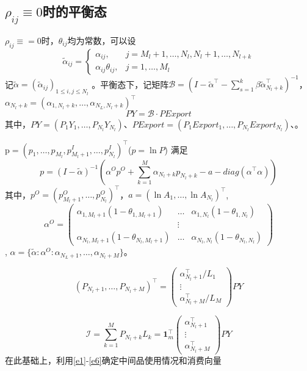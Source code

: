 \documentclass{article}
\begin{document}
\subsection{$\rho_{ij}\equiv0$时的平衡态}
$\rho_{ij}\equiv=0$时，$\theta_{ij}$均为常数，可以设
\begin{equation}
    \tilde{\alpha}_{ij}=\begin{cases}
        \alpha_{ij}, & j=M_l+1,\dots,N_l,N_l+1,\dots,N_{l+k}\\
        \alpha_{ij}\theta_{ij}, &j=1,\dots,M_l
    \end{cases}
\end{equation} 记$\tilde{\alpha}=(\tilde{\alpha}_{ij})_{1\leq i,j\leq N_l}$
。平衡态下，记矩阵$\mathcal{B}=(I-\tilde{\alpha}^\top-\sum_{s=1}^k\beta\tilde\alpha_{N_l+k}^\top)^{-1}$，$\alpha_{N_l+k}=(\alpha_{1,N_l+k},\dots, \alpha_{N_L,N_l+k})^\top$
\begin{equation}
PY=\mathcal{B}\cdot PExport
\end{equation} 其中，$PY=(P_1Y_1,\dots,P_{N_l}Y_{N_l})$、$PExport=(P_1Export_1,\dots,P_{N_l}Export_{N_l})$、。

$\mathrm{p}=(p_1,\dots,p_{M_l},p^I_{M_l+1},\dots,p^I_{N_l})^\top$($p=\ln P$) 满足
\begin{equation}
    p=(I-\tilde{\alpha})^{-1}\left(\alpha^O p^O +\sum_{k=1}^{M}\alpha_{N_l+k}p_{N_l+k}-a-diag(\alpha^\top\alpha)\right)
\end{equation} 其中，$p^O=(p^O_{M_l+1},\dots,p_{N_l}^O)^\top$，$a=(\ln A_1,\dots,\ln A_{N_l})^\top$, $$\alpha^O=\left(\begin{array}{ccc}
    \alpha_{1,M_l+1}(1-\theta_{1,M_l+1}) &\dots& \alpha_{1,N_l}(1-\theta_{1,N_l}) \\
    &\vdots &\\
     \alpha_{N_l,M_l+1}(1-\theta_{N_l,M_l+1}) &\dots& \alpha_{N_l,N_l}(1-\theta_{N_l,N_l}) 
\end{array}\right)$$, $\alpha=\{\tilde{\alpha}:\alpha^O:\alpha_{N_L+1},\dots,\alpha_{N_l+M}\}$。

\begin{equation}
    (P_{N_l+1},\dots,P_{N_l+M})^\top =\left(\begin{array}{c}
        \alpha_{N_l+1}^\top/L_1 \\
        \vdots\\
         \alpha_{N_l+M}^\top/L_M
    \end{array} \right) PY
\end{equation}

\begin{equation}
    \mathcal{I}=\sum_{k=1}^M P_{N_l+k}L_k=\mathbf{1}_m^\top\left(\begin{array}{c}
        \alpha_{N_l+1}^\top \\
        \vdots\\
         \alpha_{N_l+M}^\top
    \end{array} \right) PY
\end{equation}
在此基础上，利用\eqref{e1}-\eqref{e6}确定中间品使用情况和消费向量
\end{document}
